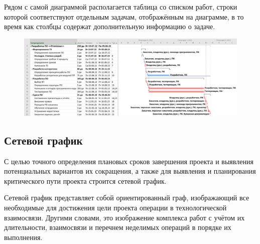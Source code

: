 Рядом с самой диаграммой располагается таблица со списком работ, строки которой соответствуют отдельным задачам, отображённым на диаграмме, в то время как столбцы содержат дополнительную информацию о задаче.




\begin{figure}[H]
	\centering
	\includegraphics[width=1.4\textwidth, angle=90]{figures/gantt.png}
	\label{fig:gantt}
\end{figure}

\subsection{Сетевой график}

С целью точного определения плановых сроков завершения проекта и выявления потенциальных вариантов их сокращения, а также для выявления и планирования критического пути проекта строится сетевой график.

Сетевой график представляет собой ориентированный граф, изображающий все необходимые для достижения цели проекта операции в технологической взаимосвязи. Другими словами, это изображение комплекса работ с учётом их длительности, взаимосвязи и перечнем неделимых операций в порядке их выполнения.


